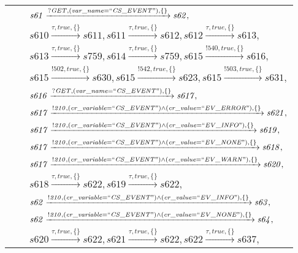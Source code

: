 \begin{tabular}{lcp{350px}}
& & $\mathit{s61}\xrightarrow{\mathit{?GET}, \mathit{(var\_name = ``CS\_EVENT")}, \{\}}\mathit{s62},$ \\
& & $\mathit{s610}\xrightarrow{\mathit{\tau}, \mathit{true}, \{\}}\mathit{s611},\mathit{s611}\xrightarrow{\mathit{\tau}, \mathit{true}, \{\}}\mathit{s612},\mathit{s612}\xrightarrow{\mathit{\tau}, \mathit{true}, \{\}}\mathit{s613},$ \\
& & $\mathit{s613}\xrightarrow{\mathit{\tau}, \mathit{true}, \{\}}\mathit{s759},\mathit{s614}\xrightarrow{\mathit{\tau}, \mathit{true}, \{\}}\mathit{s759},\mathit{s615}\xrightarrow{\mathit{!540}, \mathit{true}, \{\}}\mathit{s616},$ \\
& & $\mathit{s615}\xrightarrow{\mathit{!502}, \mathit{true}, \{\}}\mathit{s630},\mathit{s615}\xrightarrow{\mathit{!542}, \mathit{true}, \{\}}\mathit{s623},\mathit{s615}\xrightarrow{\mathit{!503}, \mathit{true}, \{\}}\mathit{s631},$ \\
& & $\mathit{s616}\xrightarrow{\mathit{?GET}, \mathit{(var\_name = ``CS\_EVENT")}, \{\}}\mathit{s617},$ \\
& & $\mathit{s617}\xrightarrow{\mathit{!210}, \mathit{(cr\_variable = ``CS\_EVENT") \land (cr\_value = ``EV\_ERROR")}, \{\}}\mathit{s621},$ \\
& & $\mathit{s617}\xrightarrow{\mathit{!210}, \mathit{(cr\_variable = ``CS\_EVENT") \land (cr\_value = ``EV\_INFO")}, \{\}}\mathit{s619},$ \\
& & $\mathit{s617}\xrightarrow{\mathit{!210}, \mathit{(cr\_variable = ``CS\_EVENT") \land (cr\_value = ``EV\_NONE")}, \{\}}\mathit{s618},$ \\
& & $\mathit{s617}\xrightarrow{\mathit{!210}, \mathit{(cr\_variable = ``CS\_EVENT") \land (cr\_value = ``EV\_WARN")}, \{\}}\mathit{s620},$ \\
& & $\mathit{s618}\xrightarrow{\mathit{\tau}, \mathit{true}, \{\}}\mathit{s622},\mathit{s619}\xrightarrow{\mathit{\tau}, \mathit{true}, \{\}}\mathit{s622},$ \\
& & $\mathit{s62}\xrightarrow{\mathit{!210}, \mathit{(cr\_variable = ``CS\_EVENT") \land (cr\_value = ``EV\_INFO")}, \{\}}\mathit{s63},$ \\
& & $\mathit{s62}\xrightarrow{\mathit{!210}, \mathit{(cr\_variable = ``CS\_EVENT") \land (cr\_value = ``EV\_NONE")}, \{\}}\mathit{s64},$ \\
& & $\mathit{s620}\xrightarrow{\mathit{\tau}, \mathit{true}, \{\}}\mathit{s622},\mathit{s621}\xrightarrow{\mathit{\tau}, \mathit{true}, \{\}}\mathit{s622},\mathit{s622}\xrightarrow{\mathit{\tau}, \mathit{true}, \{\}}\mathit{s637},$ \\

\end{tabular}
